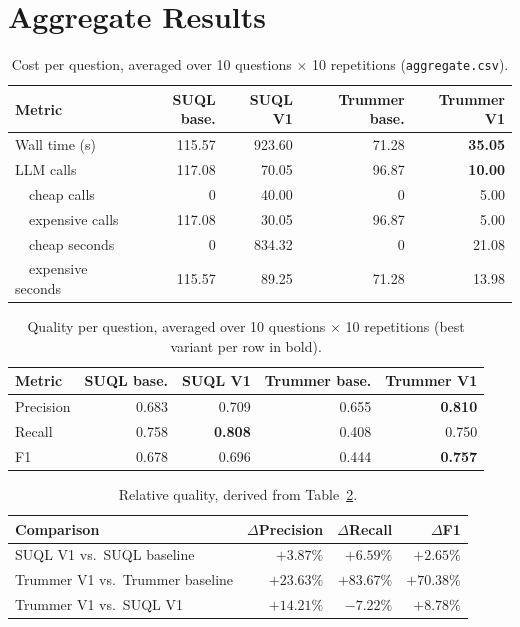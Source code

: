 \section{Aggregate Results}
\label{sec:10q-aggregate}

\begin{table}[h]
\centering\small
\begin{tabular}{lrrrr}
\toprule
Metric & SUQL base. & SUQL V1 & Trummer base. & \textbf{Trummer V1} \\
\midrule
Wall time (s) & 115.57 & 923.60 & 71.28 & \textbf{35.05} \\
LLM calls     & 117.08 & 70.05  & 96.87 & \textbf{10.00} \\
\ \ cheap calls     & 0      & 40.00  & 0     & 5.00 \\
\ \ expensive calls & 117.08 & 30.05  & 96.87 & 5.00 \\
\ \ cheap seconds   & 0      & 834.32 & 0     & 21.08 \\
\ \ expensive seconds & 115.57 & 89.25 & 71.28 & 13.98 \\
\bottomrule
\end{tabular}
\caption{Cost per question, averaged over 10 questions $\times$ 10
repetitions (\texttt{aggregate.csv}).}
\label{tab:cost-chapter5}
\end{table}

\begin{table}[h]
\centering\small
\begin{tabular}{lrrrr}
\toprule
Metric & SUQL base. & SUQL V1 & Trummer base. & \textbf{Trummer V1} \\
\midrule
Precision & 0.683 & 0.709 & 0.655 & \textbf{0.810} \\
Recall    & 0.758 & \textbf{0.808} & 0.408 & 0.750 \\
F1        & 0.678 & 0.696 & 0.444 & \textbf{0.757} \\
\bottomrule
\end{tabular}
\caption{Quality per question, averaged over 10 questions $\times$ 10
repetitions (best variant per row in bold).}
\label{tab:quality-chapter5}
\end{table}

\begin{table}[h]
\centering\small
\begin{tabular}{lrrr}
\toprule
Comparison & $\Delta$Precision & $\Delta$Recall & $\Delta$F1 \\
\midrule
SUQL V1 vs.\ SUQL baseline       & $+3.87\%$  & $+6.59\%$  & $+2.65\%$ \\
Trummer V1 vs.\ Trummer baseline & $+23.63\%$ & $+83.67\%$ & $+70.38\%$ \\
Trummer V1 vs.\ SUQL V1          & $+14.21\%$ & $-7.22\%$  & $+8.78\%$ \\
\bottomrule
\end{tabular}
\caption{Relative quality, derived from Table~\ref{tab:quality-chapter5}.}
\label{tab:quality-ratios}
\end{table}

